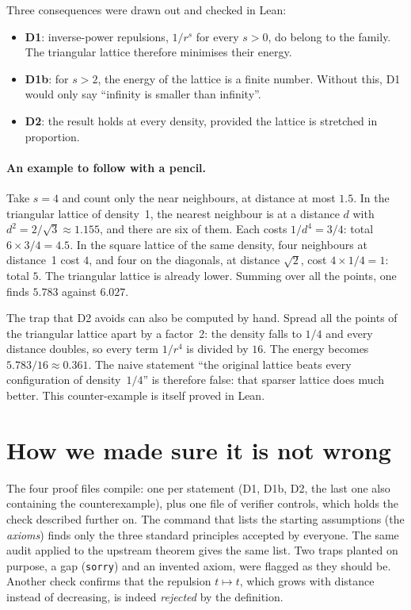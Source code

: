 Three consequences were drawn out and checked in Lean:
\begin{itemize}
\item \textbf{D1}: inverse-power repulsions, $1/r^s$ for every $s>0$, do belong to the family. The triangular
  lattice therefore minimises their energy.
\item \textbf{D1b}: for $s>2$, the energy of the lattice is a finite number. Without this, D1 would only say
  ``infinity is smaller than infinity''.
\item \textbf{D2}: the result holds at every density, provided the lattice is stretched in proportion.
\end{itemize}

\paragraph{An example to follow with a pencil.} Take $s=4$ and count only the near neighbours, at distance at most
$1.5$. In the triangular lattice of density~1, the nearest neighbour is at a distance $d$ with
$d^2=2/\sqrt3\approx1.155$, and there are six of them. Each costs $1/d^4=3/4$: total $6\times3/4=4.5$. In the
square lattice of the same density, four neighbours at distance~1 cost $4$, and four on the diagonals, at distance
$\sqrt2$, cost $4\times1/4=1$: total $5$. The triangular lattice is already lower. Summing over all the points, one
finds $5.783$ against $6.027$.

The trap that D2 avoids can also be computed by hand. Spread all the points of the triangular lattice apart by a
factor~2: the density falls to $1/4$ and every distance doubles, so every term $1/r^4$ is divided by $16$. The
energy becomes $5.783/16\approx0.361$. The naive statement ``the original lattice beats every configuration of
density~$1/4$'' is therefore false: that sparser lattice does much better. This counter-example is itself proved
in Lean.

\section*{How we made sure it is not wrong}

The four proof files compile: one per statement (D1, D1b, D2, the last one also containing the counterexample),
plus one file of verifier controls, which holds the check described further on. The command that lists the starting assumptions (the \emph{axioms}) finds only
the three standard principles accepted by everyone. The same audit applied to the upstream theorem gives the same
list. Two traps planted on purpose, a gap (\texttt{sorry}) and an invented axiom, were flagged as they should be.
Another check confirms that the repulsion $t\mapsto t$, which grows with distance instead of decreasing, is indeed
\emph{rejected} by the definition.

